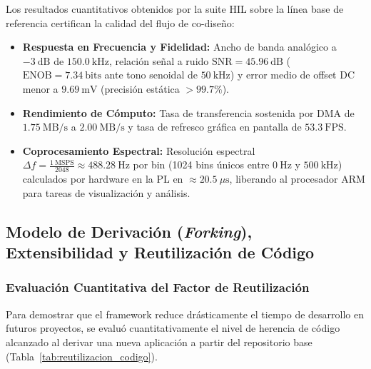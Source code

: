 \documentclass[standalone]{subfiles}
\begin{document}
Los resultados cuantitativos obtenidos por la suite HIL sobre la línea base de referencia certifican la calidad del flujo de co-diseño:
\begin{itemize}
    \item \textbf{Respuesta en Frecuencia y Fidelidad:} Ancho de banda analógico a $-3~\text{dB}$ de $150.0~\text{kHz}$, relación señal a ruido $\text{SNR} = 45.96~\text{dB}$ ($\text{ENOB} = 7.34~\text{bits}$ ante tono senoidal de $50~\text{kHz}$) y error medio de offset DC menor a $9.69~\text{mV}$ (precisión estática $>99.7\%$).
    \item \textbf{Rendimiento de Cómputo:} Tasa de transferencia sostenida por DMA de $1.75~\text{MB/s}$ a $2.00~\text{MB/s}$ y tasa de refresco gráfica en pantalla de $53.3~\text{FPS}$.
    \item \textbf{Coprocesamiento Espectral:} Resolución espectral $\Delta f = \frac{1~\text{MSPS}}{2048} \approx 488.28~\text{Hz}$ por bin (1024 bins únicos entre $0~\text{Hz}$ y $500~\text{kHz}$) calculados por hardware en la PL en $\approx 20.5~\mu\text{s}$, liberando al procesador ARM para tareas de visualización y análisis.
\end{itemize}

\subsection{Modelo de Derivación (\textit{Forking}), Extensibilidad y Reutilización de Código}
\label{subsec:modelo_forking}

\subsubsection{Evaluación Cuantitativa del Factor de Reutilización}
\label{subsubsec:factor_reutilizacion}

Para demostrar que el framework reduce drásticamente el tiempo de desarrollo en futuros proyectos, se evaluó cuantitativamente el nivel de herencia de código alcanzado al derivar una nueva aplicación a partir del repositorio base (Tabla~\ref{tab:reutilizacion_codigo}).
\end{document}
